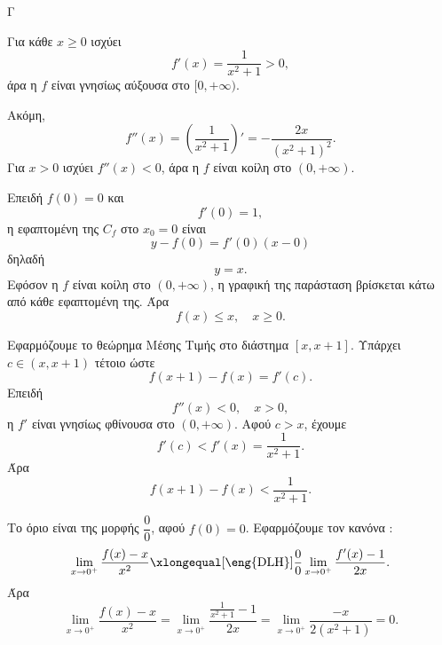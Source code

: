 \begin{thema}{Γ}
\begin{erwthma}
\item Για κάθε $x\ge 0$ ισχύει
\[
f'(x)=\frac{1}{x^2+1}>0,
\]
άρα η $f$ είναι γνησίως αύξουσα στο $[0,+\infty)$.

Ακόμη,
\[
f''(x)=\left(\frac{1}{x^2+1}\right)'=-\frac{2x}{(x^2+1)^2}.
\]
Για $x>0$ ισχύει $f''(x)<0$, άρα η $f$ είναι κοίλη στο $(0,+\infty)$.

\item Επειδή $f(0)=0$ και
\[
f'(0)=1,
\]
η εφαπτομένη της $C_f$ στο $x_0=0$ είναι
\[
y-f(0)=f'(0)(x-0)
\]
δηλαδή
\[
y=x.
\]
Εφόσον η $f$ είναι κοίλη στο $(0,+\infty)$, η γραφική της παράσταση βρίσκεται κάτω από κάθε εφαπτομένη της. Άρα
\[
f(x)\le x,\quad x\ge 0.
\]

\item Εφαρμόζουμε το θεώρημα Μέσης Τιμής στο διάστημα $[x,x+1]$. Υπάρχει $c\in(x,x+1)$ τέτοιο ώστε
\[
f(x+1)-f(x)=f'(c).
\]
Επειδή
\[
f''(x)<0,\quad x>0,
\]
η $f'$ είναι γνησίως φθίνουσα στο $(0,+\infty)$. Αφού $c>x$, έχουμε
\[
f'(c)<f'(x)=\frac{1}{x^2+1}.
\]
Άρα
\[
f(x+1)-f(x)<\frac{1}{x^2+1}.
\]

\item Το όριο είναι της μορφής $\dfrac{0}{0}$, αφού $f(0)=0$. Εφαρμόζουμε τον κανόνα :
\[
\lim_{x\to 0^+}\frac{f(x)-x}{x^2}
\xlongequal[\text{\eng{DLH}}]{\frac{0}{0}}
\lim_{x\to 0^+}\frac{f'(x)-1}{2x}.
\]
Άρα
\[
\lim_{x\to 0^+}\frac{f(x)-x}{x^2}
=
\lim_{x\to 0^+}\frac{\frac{1}{x^2+1}-1}{2x}
=
\lim_{x\to 0^+}\frac{-x}{2(x^2+1)}=0.
\]
\end{erwthma}
\end{thema}
